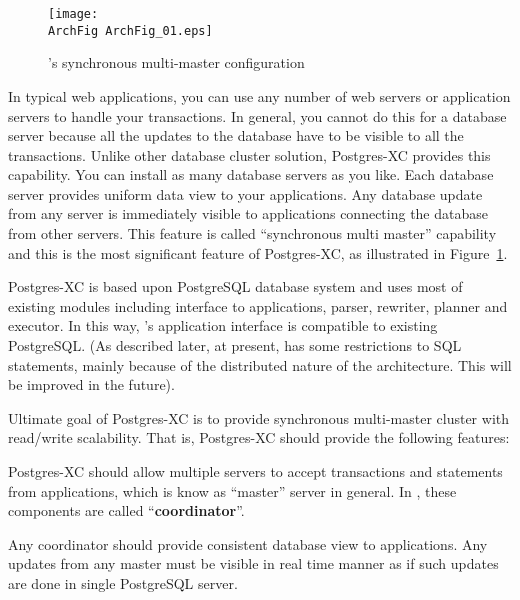   \begin{figure}[htp]
    \begin{center}
      \texttt{[image: \\ArchFig ArchFig\_01.eps]}
      \caption{\label{archfig:1}\XC's synchronous multi-master configuration}
    \end{center}
  \end{figure}

  In typical web applications, you can use any number of web servers or application servers
  to handle your transactions.
  In general, you cannot do this for a database server because all the updates to the database
  have to be visible to all the transactions.
  Unlike other database cluster solution, Postgres-XC provides this capability.
  You can install as many database servers as you like. Each database server
  provides uniform data view to your applications.
  Any database update from any server is immediately visible
  to applications connecting the database from other servers.
  This feature is called ``synchronous multi master'' capability
  and this is the most significant feature of Postgres-XC,
  as illustrated in Figure~\ref{archfig:1}.

  Postgres-XC is based upon PostgreSQL database system and uses most of existing modules
  including interface to applications, parser, rewriter, planner and executor.
  In this way, \XC's application interface is compatible to existing PostgreSQL.
  (As described later, at present, \XC{} has some restrictions to SQL statements,
  mainly because of the distributed nature of the architecture.
  This will be improved in the future).





  Ultimate goal of Postgres-XC is to provide synchronous multi-master \PG{} cluster
  with read/write scalability.
  That is, Postgres-XC should provide the following features:

  Postgres-XC should allow multiple servers to accept transactions and statements
  from applications,
  which is know as ``master'' server in general.
  In \XC, these components are called ``\textbf{coordinator}''.

  Any coordinator should provide consistent database view to applications.
  Any updates from any master must be visible in real time manner
  as if such updates are done in single PostgreSQL server.


